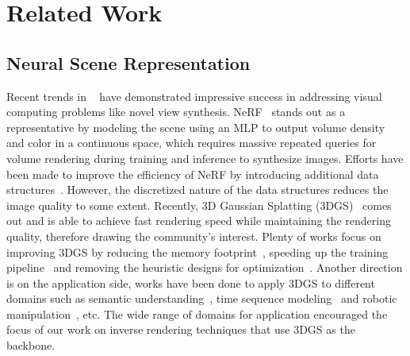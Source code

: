 \section{Related Work}
\subsection{Neural Scene Representation}
Recent trends in ~\citep{mildenhall2021nerf, yu2021plenoctrees, fridovich2022plenoxels, sitzmann2021light, yariv2021volume, miller2024objects, huang20242d, yong2024gl} have demonstrated impressive success in addressing visual computing problems like novel view synthesis. NeRF~\citep{mildenhall2021nerf} stands out as a representative by modeling the scene using an MLP to output volume density and color in a continuous space, which requires massive repeated queries for volume rendering during training and inference to synthesize images. Efforts have been made to improve the efficiency of NeRF by introducing additional data structures~\citep{garbin2021fastnerf, muller2022instant, hedman2021baking, yu2021plenoctrees, fridovich2022plenoxels, chen2022tensorf}. However, the discretized nature of the data structures reduces the image quality to some extent. Recently, 3D Gaussian Splatting (3DGS)~\citep{kerbl20233d} comes out and is able to achieve fast rendering speed while maintaining the rendering quality, therefore drawing the community's interest. Plenty of works focus on improving 3DGS by reducing the memory footprint~\citep{fan2023lightgaussian, navaneet2023compact3d, niedermayr2024compressed}, speeding up the training pipeline~\citep{mallick2024taming, hollein20243dgs} and removing the heuristic designs for optimization~\citep{kheradmand20243d, bulo2024revising}. Another direction is on the application side, works have been done to apply 3DGS to different domains such as semantic understanding~\citep{qin2024langsplat, guo2024semantic}, time sequence modeling~\citep{luiten2024dynamic, lin2024gaussian} and robotic manipulation~\citep{lu2024manigaussian, shorinwa2024splat}, etc. The wide range of domains for application encouraged the focus of our work on inverse rendering techniques that use 3DGS as the backbone.

